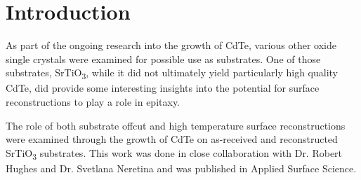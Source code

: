 \section{Introduction}
As part of the ongoing research into the growth of CdTe, various other oxide single crystals were examined for possible use as substrates. One of those substrates, SrTiO\textsubscript{3}, while it did not ultimately yield particularly high quality CdTe, did provide some interesting insights into the potential for surface reconstructions to play a role in epitaxy.

The role of both substrate offcut and high temperature surface reconstructions were examined through the growth of CdTe on as-received and reconstructed SrTiO\textsubscript{3} substrates. This work was done in close collaboration with Dr. Robert Hughes and Dr. Svetlana Neretina and was published in Applied Surface Science\cite{Neretina2009a}.

